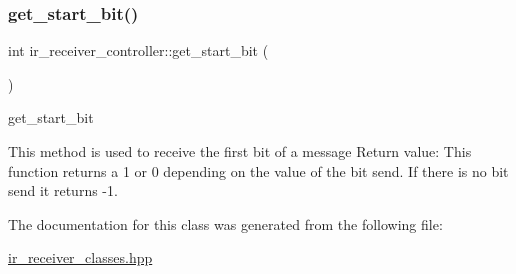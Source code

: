 \subsubsection{\texorpdfstring{get\+\_\+start\+\_\+bit()}{get\_start\_bit()}}
{\footnotesize\ttfamily int ir\+\_\+receiver\+\_\+controller\+::get\+\_\+start\+\_\+bit (\begin{DoxyParamCaption}{ }\end{DoxyParamCaption})\hspace{0.3cm}{\ttfamily [inline]}}



get\+\_\+start\+\_\+bit 

This method is used to receive the first bit of a message Return value\+: This function returns a 1 or 0 depending on the value of the bit send. If there is no bit send it returns -\/1. 

The documentation for this class was generated from the following file\+:\begin{DoxyCompactItemize}
\item 
\hyperlink{ir__receiver__classes_8hpp}{ir\+\_\+receiver\+\_\+classes.\+hpp}\end{DoxyCompactItemize}
